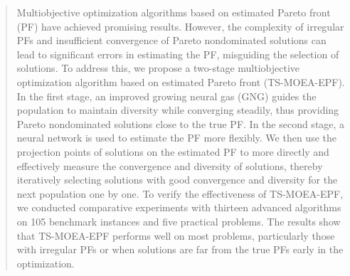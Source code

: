 \documentclass[a4paper,fleqn]{cas-dc}
\begin{document}
\begin{sloppypar}



\begin{abstract}
Multiobjective optimization algorithms based on estimated Pareto front (PF) have achieved promising results. However, the complexity of irregular PFs and insufficient convergence of Pareto nondominated solutions can lead to significant errors in estimating the PF, misguiding the selection of solutions. To address this, we propose a two-stage multiobjective optimization algorithm based on estimated Pareto front (TS-MOEA-EPF). In the first stage, an improved growing neural gas (GNG) guides the population to maintain diversity while converging steadily, thus providing Pareto nondominated solutions close to the true PF. In the second stage, a neural network is used to estimate the PF more flexibly. We {then} use the projection points of solutions on the estimated PF to more directly and effectively measure the convergence and diversity of  solutions, thereby  iteratively selecting  solutions with good convergence and diversity for the next population one by one. To verify the effectiveness of TS-MOEA-EPF, we conducted comparative experiments with {thirteen} advanced algorithms on 105 {benchmark} instances and five practical problems. The results show that TS-MOEA-EPF performs well on most  problems, particularly those with irregular PFs or when  solutions are far from the true PFs early in the optimization.
\end{abstract}




\end{sloppypar}
\end{document}
